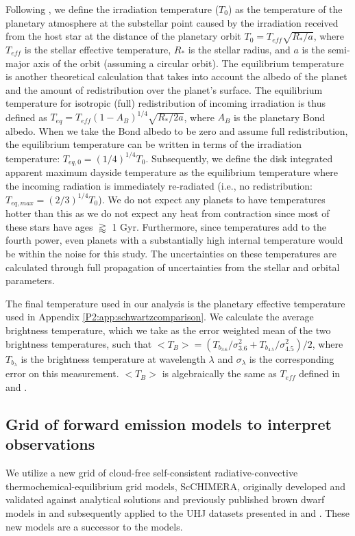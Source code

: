 Following \citet{Hansen2008}, we define the irradiation temperature ($T_0$) as the temperature of the planetary atmosphere at the  substellar point caused by the irradiation received from the host star at the distance of the planetary orbit $T_0 = T_{eff} \sqrt{R_*/a}$, where $T_{eff}$ is the stellar effective temperature, $R_*$ is the stellar radius, and $a$ is the semi-major axis of the orbit (assuming a circular orbit).
The equilibrium temperature is another theoretical calculation that takes into account the albedo of the planet and the amount of redistribution over the planet's surface. The equilibrium temperature for isotropic (full) redistribution of incoming irradiation is thus defined as $T_{eq} = T_{eff}(1-A_B)^{1/4} \sqrt{R_*/2a}$, where $A_B$ is the planetary Bond albedo. When we take the Bond albedo to be zero and assume full redistribution, the equilibrium temperature can be written in terms of the irradiation temperature: $T_{eq,\textit{0}} = (1/4)^{1/4} T_0$. Subsequently, we define the disk integrated apparent maximum dayside temperature \citep{Schwartz2017} as the equilibrium temperature where the incoming radiation is immediately re-radiated (i.e., no redistribution: $T_{eq,max} = (2/3)^{1/4} T_0$). We do not expect any planets to have temperatures hotter than this as we do not expect any heat from contraction since most of these stars have ages $\gtrapprox$ 1 Gyr. Furthermore, since temperatures add to the fourth power, even planets with a substantially high internal temperature \citep[e.g.,][]{Thorngren2019} would be within the noise for this study. The uncertainties on these temperatures are calculated through full propagation of uncertainties from the stellar and orbital parameters.

The final temperature used in our analysis is the planetary effective temperature used in Appendix \ref{P2:app:schwartzcomparison}. We calculate the average brightness temperature, which we take as the error weighted mean of the two brightness temperatures, such that $<T_B> = (T_{b_{3.6}}/ \sigma_{3.6}^2 +  T_{b_{4.5}}/\sigma_{4.5}^2) / 2 $, where $T_{b_{\lambda}}$ is the brightness temperature at wavelength $\lambda$ and $\sigma_{\lambda}$ is the corresponding error on this measurement. $<T_B>$ is algebraically the same as $T_{eff}$ defined in \citet{Schwartz2015} and \citet{Cowan2011}.

\subsection{Grid of forward emission models to interpret observations}
\label{P2:sec:models}
We utilize a new grid of cloud-free self-consistent radiative-convective thermochemical-equilibrium grid models, ScCHIMERA, originally developed and validated against analytical solutions and previously published brown dwarf models in \citet{Piskorz2018} and subsequently applied to the UHJ datasets presented in \citet{Arcangeli2018, Mansfield2018} and \citet{Kreidberg2018}. These new models are a successor to the \citet{Fortney2008} models.

